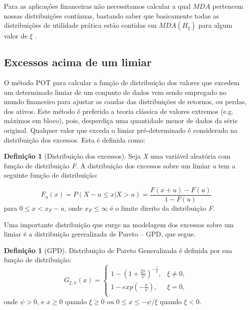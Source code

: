 \documentclass[review]{elsarticle}
\theoremstyle{definition}
\newtheorem{defi}[teor]{Definição}
\begin{document}
Para as aplicações financeiras não necessitamos calcular a qual $MDA$ pertencem nossas distribuições contínuas, bastando saber que basicamente todas as distribuições de utilidade prática estão contidas em $MDA(H_\xi)$ para algum valor de $\xi$ \cite[p. ~139]{McNeil2015}.

\subsection{Excessos acima de um limiar}
\label{sec:excess}

O método POT para calcular a função de distribuição dos valores que excedem um determinado limiar de um conjunto de dados vem sendo empregado no mundo financeiro para ajustar as caudas das distribuições de retornos, ou perdas, dos ativos. Este método é preferido a teoria clássica de valores extremos (e.g. máximos em bloco), pois, desperdiça uma quantidade menor de dados da série original. Qualquer valor que exceda o limiar pré-determinado é considerado na distribuição dos excessos. Esta é definida como:

\begin{defi}[Distribuição dos excessos] \label{defi:excess}
	Seja \emph{X} uma variável aleatória com função de distribuição \emph{F}. A distribuição dos excessos sobre um limiar \emph{u} tem a seguinte função de distribuição:
	
	\begin{equation}
	\label{eq:excessdist}
	F_u(x)=P(X-u \leq x | X > u)=\frac{F(x+u)-F(u)}{1-F(u)}
	\end{equation}
	para $0 \leq x < x_F-u$, onde $x_F \leq \infty$ é o limite direito da distribuição \emph{F}.
\end{defi}

Uma importante distribuição que surge na modelagem dos excessos sobre um limiar é a distribuição gereralizada de Pareto – GPD, que segue.

\begin{defi}[GPD] \label{defi:GPD}
	Distribuição de Pareto Generalizada é definida por sua função de distribuição:
	\begin{equation}
	\label{eq:GPD}
	G_{\xi,\psi}(x) = 
	\begin{cases}
	1- \left(1+ \frac{\xi x}{\psi} \right)^{-\frac{1}{\xi}}, & \xi \neq 0,\\
	1-exp\left(-\frac{x}{\psi}\right), & \xi = 0,\\
	\end{cases}
	\end{equation}
	onde $\psi > 0$, e $x\geq 0$ quando $\xi  \geq 0$ ou $0 \leq x \leq -\psi / \xi$ quando $\xi < 0$.
\end{defi}
\end{document}
